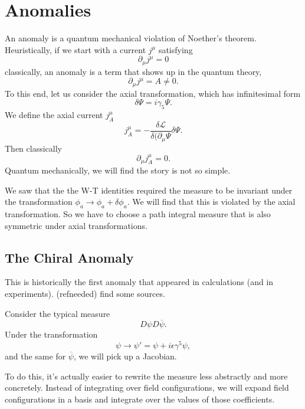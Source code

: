\documentclass[main.tex]{subfiles}
\begin{document}
\chapter{Anomalies}
An anomaly is a quantum mechanical violation of Noether's theorem. Heuristically, if we start with a current  $j^\mu$ satisfying
\[
\partial_\mu j^\mu = 0
\]
classically, an anomaly is a term that shows up in the quantum theory,
\[
\partial_\mu j^\mu = A \neq 0.
\]
To this end, let us consider the axial transformation, which has infinitesimal form
\[
\delta \Psi = i \gamma_5 \Psi.
\]
We define the axial current $j^\mu_A$
\[
j^\mu_A = - \frac{\delta \mathcal{L}}{\delta (\partial_\mu \Psi} \delta \Psi.
\]
Then classically 
\[
\partial_\mu j^\mu_A = 0.
\]
Quantum mechanically, we will find the story is not so simple. 

We saw that the the W-T identities required the measure to be invariant under the transformation $\phi_a \to \phi_a + \delta \phi_a$. We will find that this is violated by the axial transformation. So we have to choose a path integral measure that is also symmetric under axial transformations.

\section{The Chiral Anomaly}
This is historically the first anomaly that appeared in calculations (and in experiments). (refneeded) find some sources.

Consider the typical measure
\begin{equation} \label{pimeas}
D\psi D \overline{\psi}.
\end{equation}
Under the transformation
\[
\psi \to \psi' = \psi + i \epsilon \gamma^5 \psi,
\]
and the same for $\overline{\psi}$, we will pick up a Jacobian.

To do this, it's actually easier to rewrite the measure less abstractly and more concretely. Instead of integrating over field configurations, we will expand field configurations in a basis and integrate over the values of those coefficients. 
\end{document}
